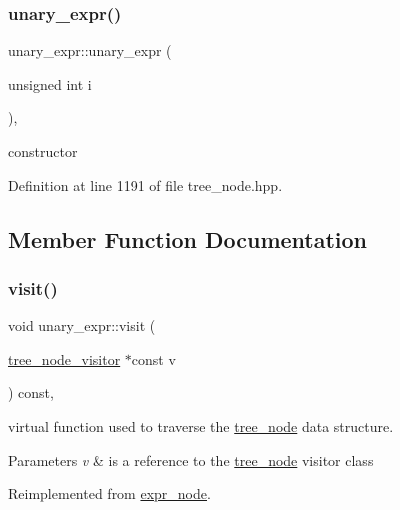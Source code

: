 \subsubsection{\texorpdfstring{unary\+\_\+expr()}{unary\_expr()}}
{\footnotesize\ttfamily unary\+\_\+expr\+::unary\+\_\+expr (\begin{DoxyParamCaption}\item[{unsigned int}]{i }\end{DoxyParamCaption})\hspace{0.3cm}{\ttfamily [inline]}, {\ttfamily [explicit]}}



constructor 



Definition at line 1191 of file tree\+\_\+node.\+hpp.



\subsection{Member Function Documentation}
\mbox{\label{structunary__expr_a0373bfbbec394ab8d9e88b5ff6d60890}} 
\subsubsection{\texorpdfstring{visit()}{visit()}}
{\footnotesize\ttfamily void unary\+\_\+expr\+::visit (\begin{DoxyParamCaption}\item[{\hyperlink{classtree__node__visitor}{tree\+\_\+node\+\_\+visitor} $\ast$const}]{v }\end{DoxyParamCaption}) const\hspace{0.3cm}{\ttfamily [override]}, {\ttfamily [virtual]}}



virtual function used to traverse the \hyperlink{classtree__node}{tree\+\_\+node} data structure. 


\begin{DoxyParams}{Parameters}
{\em v} & is a reference to the \hyperlink{classtree__node}{tree\+\_\+node} visitor class \\
\hline
\end{DoxyParams}


Reimplemented from \hyperlink{structexpr__node_aac767878f13ca07371dde2c3938ef38a}{expr\+\_\+node}.




